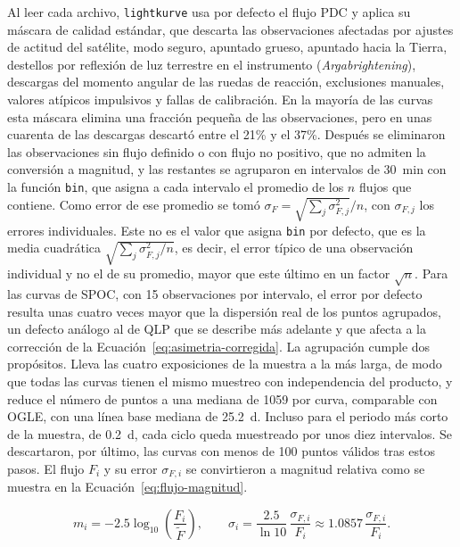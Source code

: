 \documentclass[12pt,letterpaper,oneside]{book}
\begin{document}
Al leer cada archivo, \texttt{lightkurve} usa por defecto el flujo PDC y aplica su m\'ascara de calidad est\'andar, que descarta las observaciones afectadas por ajustes de actitud del sat\'elite, modo seguro, apuntado grueso, apuntado hacia la Tierra, destellos por reflexi\'on de luz terrestre en el instrumento (\emph{Argabrightening}), descargas del momento angular de las ruedas de reacci\'on, exclusiones manuales, valores at\'ipicos impulsivos y fallas de calibraci\'on. En la mayor\'ia de las curvas esta m\'ascara elimina una fracci\'on peque\~na de las observaciones, pero en unas cuarenta de las descargas descart\'o entre el 21\% y el 37\%. Despu\'es se eliminaron las observaciones sin flujo definido o con flujo no positivo, que no admiten la conversi\'on a magnitud, y las restantes se agruparon en intervalos de 30~min con la funci\'on \texttt{bin}, que asigna a cada intervalo el promedio de los $n$ flujos que contiene. Como error de ese promedio se tom\'o $\sigma_F=\sqrt{\sum_j\sigma_{F,j}^2}/n$, con $\sigma_{F,j}$ los errores individuales. Este no es el valor que asigna \texttt{bin} por defecto, que es la media cuadr\'atica $\sqrt{\sum_j\sigma_{F,j}^2/n}$, es decir, el error t\'ipico de una observaci\'on individual y no el de su promedio, mayor que este \'ultimo en un factor $\sqrt{n}$. Para las curvas de SPOC, con 15 observaciones por intervalo, el error por defecto resulta unas cuatro veces mayor que la dispersi\'on real de los puntos agrupados, un defecto an\'alogo al de QLP que se describe m\'as adelante y que afecta a la correcci\'on de la Ecuaci\'on~\eqref{eq:asimetria-corregida}. La agrupaci\'on cumple dos prop\'ositos. Lleva las cuatro exposiciones de la muestra a la m\'as larga, de modo que todas las curvas tienen el mismo muestreo con independencia del producto, y reduce el n\'umero de puntos a una mediana de 1059 por curva, comparable con OGLE, con una l\'inea base mediana de 25.2~d. Incluso para el periodo m\'as corto de la muestra, de 0.2~d, cada ciclo queda muestreado por unos diez intervalos. Se descartaron, por \'ultimo, las curvas con menos de 100 puntos v\'alidos tras estos pasos. El flujo $F_i$ y su error $\sigma_{F,i}$ se convirtieron a magnitud relativa como se muestra en la Ecuaci\'on~\eqref{eq:flujo-magnitud}.

\begin{equation}
	m_i = -2.5\log_{10}\left(\frac{F_i}{\tilde F}\right), \qquad \sigma_i = \frac{2.5}{\ln 10}\,\frac{\sigma_{F,i}}{F_i} \approx 1.0857\,\frac{\sigma_{F,i}}{F_i}.
	\label{eq:flujo-magnitud}
\end{equation}
\end{document}
